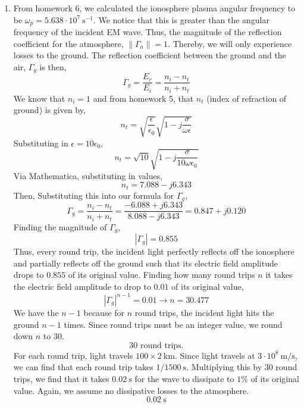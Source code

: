 \documentclass[12pt]{article}
\begin{document}
\begin{enumerate}
\begin{enumerate}
		\item [(d)]
		From homework 6, we calculated the ionosphere plasma angular frequency to be $\omega_p=5.638 \cdot 10^7 \: \mathrm{s}^{-1}$.
		We notice that this is greater than the angular frequency of the incident EM wave.
		Thus, the magnitude of the reflection coefficient for the atmosphere, $\|\Gamma_a\|=1$.
		Thereby, we will only experience losses to the ground.
		The reflection coefficient between the ground and the air, $\Gamma_g$ is then,
		\[\Gamma_g = \frac{E_r}{E_i}=\frac{n_i-n_t}{n_i+n_t}\]
		We know that $n_i=1$ and from homework 5, that $n_t$ (index of refraction of ground) is given by,
		\[n_t = \sqrt{\frac{\epsilon}{\epsilon_0}}\sqrt{1-j\frac{\sigma}{\omega \epsilon}}\]
		Substituting in $\epsilon=10\epsilon_0$,
		\[n_t=\sqrt{10}\sqrt{1-j\frac{\sigma}{10\omega \epsilon_0}}\]
		Via Mathematica, substituting in values,
		\[n_t= 7.088-j6.343\]
		Then,
		Substituting this into our formula for $\Gamma_g$,
		\[\Gamma_g = \frac{n_i-n_t}{n_i+n_t}=\frac{-6.088+j6.343}{8.088-j6.343}=0.847+j0.120\]
		Finding the magnitude of $\Gamma_g$,
		\[|\Gamma_g|=0.855\]
		Thus, every round trip, the incident light perfectly reflects off the ionosphere and partially reflects off the ground such that its electric field amplitude drops to $0.855$ of its original value.
		Finding how many round trips $n$ it takes the electric field amplitude to drop to $0.01$ of its original value,
		\[|\Gamma_g|^{n-1} = 0.01 \to n = 30.477\]
		We have the $n-1$ because for $n$ round trips, the incident light hits the ground $n-1$ times.
		Since round trips must be an integer value, we round down $n$ to $30$.
		\[\boxed{30 \text{ round trips.}}\]
		For each round trip, light travels $100\times 2\:\mathrm{km}$.
		Since light travels at $3\cdot 10^8\:\mathrm{m/s}$, we can find that each round trip takes $1/1500\:\mathrm{s}$.
		Multiplying this by 30 round trips, we find that it takes $0.02\:\mathrm{s}$ for the wave to dissipate to $1\%$ of its original value.
		Again, we assume no dissipative losses to the atmosphere.
		\[\boxed{0.02 \: \mathrm{s}}\]


\end{enumerate}
\end{enumerate}
\end{document}
